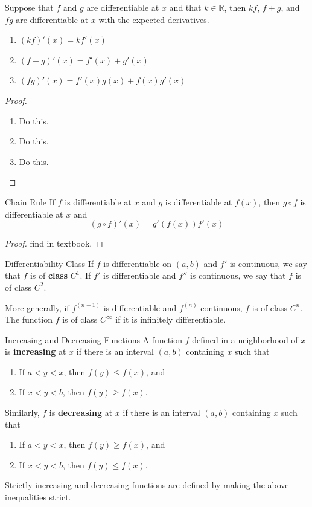 \documentclass[10pt]{report}
\begin{document}
\begin{thrm}{}{}
Suppose that $f$ and $g$ are differentiable at $x$ and that $k \in \mathbb{R}$, then $kf$, $f+g$, and $fg$ are differentiable at $x$ with the expected derivatives.
\begin{enumerate}
	\item $(kf)'(x) = kf'(x)$
	\item $(f+g)'(x) = f'(x) + g'(x)$
	\item $(fg)'(x) = f'(x) g(x) + f(x) g'(x)$
\end{enumerate}
\end{thrm}
\begin{proof}
	\begin{enumerate}
		\item {\color{red}Do this.}
		\item {\color{red}Do this.}
		\item {\color{red}Do this.}
	\end{enumerate}
\end{proof}

\begin{thrm}{Chain Rule}{}
	If $f$ is differentiable at $x$ and $g$ is differentiable at $f(x)$, then $g \circ f$ is differentiable at $x$ and
	\[
		(g \circ f)'(x) = g'(f(x)) f'(x)
	\] 
\end{thrm}
\begin{proof}
	{\color{red}find in textbook.}
\end{proof}

\begin{defn}{Differentiability Class}{}
	If $f$ is differentiable on $(a,b)$ and $f'$ is continuous, we say that $f$ is of \textbf{class} $C^1$. If $f'$ is differentiable and $f''$ is continuous, we say that $f$ is of class $C^2$.

More generally, if $f^{(n-1)}$ is differentiable and $f^{(n)}$ continuous, $f$ is of class $C^{n}$. The function $f$ is of class $C^{\infty}$ if it is infinitely differentiable. 
\end{defn}


\begin{defn}{Increasing and Decreasing Functions}{}
	A function $f$ defined in a neighborhood of $x$ is \textbf{increasing} at $x$ if there is an interval $(a,b)$ containing $x$ such that
	\begin{enumerate}
		\item If $a < y < x$, then $f(y) \leq f(x)$, and
		\item If $x < y < b$, then $f(y) \geq f(x)$.
	\end{enumerate}
	Similarly, $f$ is \textbf{decreasing} at $x$ if there is an interval $(a,b)$ containing $x$ such that
	\begin{enumerate}
		\item If $a < y < x$, then $f(y) \geq f(x)$, and
		\item If $x < y < b$, then $f(y) \leq f(x)$.
	\end{enumerate}
	Strictly increasing and decreasing functions are defined by making the above inequalities strict.
\end{defn}
\end{document}
